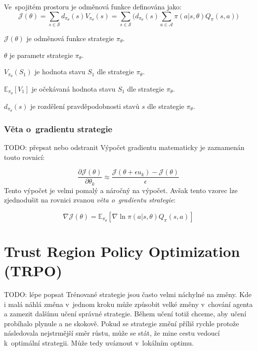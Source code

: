 Ve~spojitém prostoru je odměnová funkce definována jako:
\begin{equation}
    \label{eq:ucelova_funkce_spojita}
  \mathcal{J}(\theta) = \sum_{s \in \mathcal{S}} d_{\pi_\theta}(s) V_{\pi_\theta}(s) = \sum_{s \in \mathcal{S}} \Big( d_{\pi_\theta}(s) \sum_{a \in \mathcal{A}} \pi(a \vert s, \theta) Q_\pi(s, a) \Big)
  \end{equation}

\begin{myitemize}
  \item $\mathcal{J}(\theta)$ je odměnová funkce strategie $\pi_\theta$.
  \item $\theta$ je parametr strategie $\pi_\theta$.
  \item $V_{\pi_\theta}(S_1)$ je hodnota stavu $S_1$ dle strategie $\pi_\theta$.
  \item $\mathbb{E}_{\pi_\theta}[V_1]$ je očekávaná hodnota stavu $S_1$ dle strategie $\pi_\theta$.
  \item $d_{\pi_\theta}(s)$ je rozdělení pravděpodobnosti stavů $s$ dle strategie $\pi_\theta$.
\end{myitemize}

\subsubsection*{Věta o~gradientu strategie}
{\color{red}TODO: přepsat nebo odstranit}
Výpočet gradientu matematicky je zaznamenán touto rovnicí:

\begin{equation}
  \label{eq:gradient_strategie}
  \frac{\partial \mathcal{J}(\theta)}{\partial \theta_k} \approx \frac{\mathcal{J}(\theta + \epsilon u_k) - \mathcal{J}(\theta)}{\epsilon}
\end{equation}
Tento výpočet je velmi pomalý a náročný na výpočet.
Avšak tento vzorec lze zjednodušit na rovnici zvanou \emph{věta o~gradientu strategie}:

\begin{equation}
    \label{eq:veta_o_gradientu_strategie}
  \nabla \mathcal{J}(\theta) = \mathbb{E}_{\pi_\theta} [\nabla \ln \pi(a \vert s, \theta) Q_\pi(s, a)]
\end{equation}


\section{Trust Region Policy Optimization (TRPO)}\label{sec:trust-region-policy-optimization}
{\color{red}TODO: lépe popsat}
Trénované strategie jsou často velmi náchylné na změny.
Kde i malá náhlá změna v~jednom kroku může způsobit velké změny v~chování agenta a zamezit dalšímu učení správné strategie.
Během učení totiž chceme, aby učení probíhalo plynule a ne skokově.
Pokud se strategie změní příliš rychle protože následovala nejstrmější směr růstu, může se stát, že mine cestu vedoucí k~optimální strategii.
Může tedy uváznout v~lokálním optimu.

